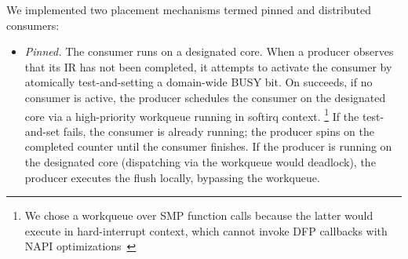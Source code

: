 We implemented two placement mechanisms termed pinned and distributed consumers:
\begin{itemize}[leftmargin=*]
\item {\it Pinned.}
The consumer runs on a designated core. %
When a producer observes that its IR has not been completed, 
    it attempts to activate the consumer by atomically test-and-setting a domain-wide BUSY bit.
On succeeds, if no consumer is active,
    the producer schedules the consumer on the designated core
    via a high-priority workqueue running in softirq context.%
\footnote{We chose a workqueue over SMP function calls because the latter would execute in hard-interrupt context,
which cannot invoke DFP callbacks with NAPI optimizations~\cite{linux_napi,mlx5_napi_poll}}
If the test-and-set fails, the consumer is already running;
the producer spins on the completed counter until the consumer finishes.
If the producer is running on the designated core
(dispatching via the workqueue would deadlock), %
    the producer executes the flush locally, bypassing the workqueue.






\end{itemize}
